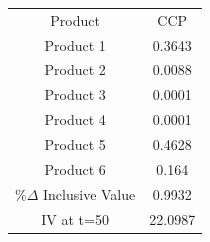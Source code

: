 \begin{tabular}{cc}
Product & CCP \\
Product 1 & 0.3643 \\
Product 2 & 0.0088 \\
Product 3 & 0.0001 \\
Product 4 & 0.0001 \\
Product 5 & 0.4628 \\
Product 6 & 0.164 \\
$\%\Delta$ Inclusive Value & 0.9932 \\
IV at t=50 & 22.0987 \\
\end{tabular}
